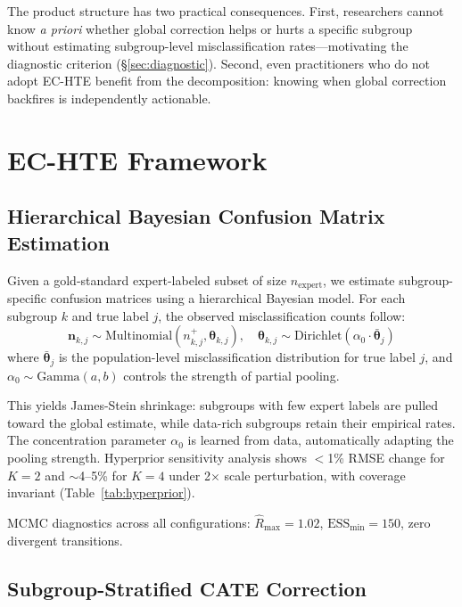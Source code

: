 \documentclass[11pt,a4paper]{article}
\begin{document}
The product structure has two practical consequences.
First, researchers cannot know \emph{a priori} whether global correction helps or hurts a specific subgroup without estimating subgroup-level misclassification rates---motivating the diagnostic criterion (\S\ref{sec:diagnostic}).
Second, even practitioners who do not adopt EC-HTE benefit from the decomposition: knowing when global correction backfires is independently actionable.


\section{EC-HTE Framework}

\subsection{Hierarchical Bayesian Confusion Matrix Estimation}

Given a gold-standard expert-labeled subset of size $n_{\text{expert}}$, we estimate subgroup-specific confusion matrices using a hierarchical Bayesian model.
For each subgroup $k$ and true label $j$, the observed misclassification counts follow:
\begin{equation}
\mathbf{n}_{k,j} \sim \text{Multinomial}(n_{k,j}^{+}, \boldsymbol{\theta}_{k,j}), \quad
\boldsymbol{\theta}_{k,j} \sim \text{Dirichlet}(\alpha_0 \cdot \bar{\boldsymbol{\theta}}_j)
\end{equation}
where $\bar{\boldsymbol{\theta}}_j$ is the population-level misclassification distribution for true label $j$, and $\alpha_0 \sim \text{Gamma}(a, b)$ controls the strength of partial pooling.

This yields James-Stein shrinkage: subgroups with few expert labels are pulled toward the global estimate, while data-rich subgroups retain their empirical rates.
The concentration parameter $\alpha_0$ is learned from data, automatically adapting the pooling strength.
Hyperprior sensitivity analysis shows $<$1\% RMSE change for $K=2$ and $\sim$4--5\% for $K=4$ under 2$\times$ scale perturbation, with coverage invariant (Table~\ref{tab:hyperprior}).

MCMC diagnostics across all configurations: $\hat{R}_{\max} = 1.02$, $\text{ESS}_{\min} = 150$, zero divergent transitions.

\subsection{Subgroup-Stratified CATE Correction}
\end{document}
